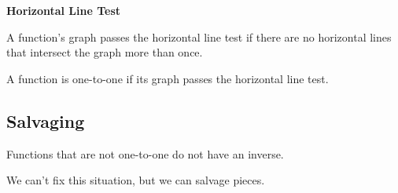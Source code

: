 \documentclass{ximera}
\begin{document}
\begin{example}
\begin{image}
\end{image}






\end{example}




\begin{definition} \textbf{\textcolor{green!50!black}{Horizontal Line Test}}  


A function's graph passes the horizontal line test if there are no horizontal lines that intersect the graph more than once.


A function is one-to-one if its graph passes the horizontal line test.

\end{definition}
















\subsection*{Salvaging}


Functions that are not one-to-one do not have an inverse.

We can't fix this situation, but we can salvage pieces. 
\end{document}
